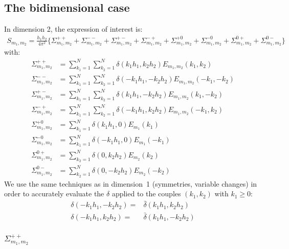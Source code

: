 \subsection{The bidimensional case}
In dimension 2, the expression of interest is:
\begin{align}
S_{m_1,m_2}=\frac{h_1h_2}{4\pi^2}\Big\{
  \Sigma_{m_1,m_2}^{++} + \Sigma_{m_1,m_2}^{--} + \Sigma_{m_1,m_2}^{+-} + \Sigma_{m_1,m_2}^{-+} +
  \Sigma_{m_1,m_2}^{+0} + \Sigma_{m_1,m_2}^{-0} + \Sigma_{m_1,m_2}^{0+} + \Sigma_{m_1,m_2}^{0-}
\Big\}
\end{align}
with:
\begin{align}
\Sigma_{m_1,m_2}^{++}&=\sum_{k_1=1}^{N}\sum_{k_2=1}^{N}\delta\left(k_1h_1,k_2h_2\right)E_{m_1,m_2}(k_1,k_2)\\
\Sigma_{m_1,m_2}^{--}&=\sum_{k_1=1}^{N}\sum_{k_2=1}^{N}\delta\left(-k_1h_1,-k_2h_2\right)E_{m_1,m_2}(-k_1,-k_2)\\
\Sigma_{m_1,m_2}^{+-}&=\sum_{k_1=1}^{N}\sum_{k_2=1}^{N}\delta\left(k_1h_1,-k_2h_2\right)E_{m_1,m_2}(k_1,-k_2)\\
\Sigma_{m_1,m_2}^{-+}&=\sum_{k_1=1}^{N}\sum_{k_2=1}^{N}\delta\left(-k_1h_1,k_2h_2\right)E_{m_1,m_2}(-k_1,k_2)\\
\Sigma_{m_1,m_2}^{+0}&=\sum_{k_1=1}^{N}\delta(k_1h_1,0)E_{m_1}(k_1)\\
\Sigma_{m_1,m_2}^{-0}&=\sum_{k_1=1}^{N}\delta(-k_1h_1,0)E_{m_1}(-k_1)\\
\Sigma_{m_1,m_2}^{0+}&=\sum_{k_2=1}^{N}\delta(0,k_2h_2)E_{m_2}(k_2)\\
\Sigma_{m_1,m_2}^{0-}&=\sum_{k_2=1}^{N}\delta(0,-k_2h_2)E_{m_2}(-k_2)
\end{align}
We use the same techniques as in dimension~1 (symmetries, variable changes) in order to accurately evaluate the $\delta$ applied to the couples $(k_1, k_2)$ with $k_1\geq 0$:
\begin{align}
\delta\left(-k_1h_1,-k_2h_2\right)=&\bar{\delta}\left(k_1h_1,k_2h_2\right)\\
\delta\left(-k_1h_1, k_2h_2\right)=&\bar{\delta}\left(k_1h_1,-k_2h_2\right)
\end{align}

\subsubsection{\texorpdfstring{$\Sigma_{m_1,m_2}^{++}$}{sigma++}}

